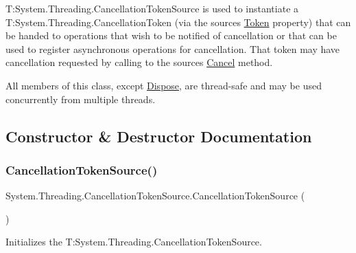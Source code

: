 T\+:\+System.\+Threading.\+Cancellation\+Token\+Source is used to instantiate a T\+:\+System.\+Threading.\+Cancellation\+Token (via the source\textquotesingle{}s \hyperlink{class_system_1_1_threading_1_1_cancellation_token_source_a2ab44a79f438139faf4f7dcce1b3e5b2}{Token} property) that can be handed to operations that wish to be notified of cancellation or that can be used to register asynchronous operations for cancellation. That token may have cancellation requested by calling to the source\textquotesingle{}s \hyperlink{class_system_1_1_threading_1_1_cancellation_token_source_a1c5aa6f903b7d50df87b7969f9ad10da}{Cancel} method. 

All members of this class, except \hyperlink{class_system_1_1_threading_1_1_cancellation_token_source_afc50851c41375492d93a0f8ca40cf639}{Dispose}, are thread-\/safe and may be used concurrently from multiple threads. 

\subsection{Constructor \& Destructor Documentation}
\mbox{\label{class_system_1_1_threading_1_1_cancellation_token_source_a886124793e6a1c6a893abd6e30a8aff7}} 
\subsubsection{\texorpdfstring{Cancellation\+Token\+Source()}{CancellationTokenSource()}\hspace{0.1cm}{\footnotesize\ttfamily [1/3]}}
{\footnotesize\ttfamily System.\+Threading.\+Cancellation\+Token\+Source.\+Cancellation\+Token\+Source (\begin{DoxyParamCaption}{ }\end{DoxyParamCaption})\hspace{0.3cm}{\ttfamily [inline]}}



Initializes the T\+:\+System.\+Threading.\+Cancellation\+Token\+Source. 

\mbox{\label{class_system_1_1_threading_1_1_cancellation_token_source_a5da3070947650baffa2fa6dc9871c0e8}} 
